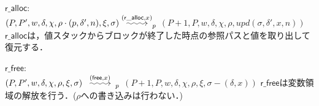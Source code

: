 \documentclass[submit,PRO]{ipsj}
\makeatletter
\newcommand{\longsquiggly}{\xymatrix{{}\ar@{~>}[r]&{}}}
\newcommand{\bcode}[1]{$\mathsf{#1}$}
\newcommand{\brightarrow}[1]{\stackrel{#1}{\longsquiggly}}
\makeatother
\begin{document}
\begin{list}
\item \bcode{r\_alloc}:\\\relax
$(P,P',w,\delta,\chi,\rho\cdot(p,\delta',n),\xi,\sigma)\brightarrow{(\mathsf{r\_alloc},x)}_p$\newline
\qquad $(P+1,P,w,\delta,\chi,\rho,upd(\sigma,\delta',x,n))$\newline
\bcode{r\_alloc}は，値スタックからブロックが終了した時点の参照パスと値を取り出して復元する．
\item \bcode{r\_free}:\\
$(P,P',w,\delta,\chi,\rho,\xi,\sigma)\brightarrow{(\mathsf{free},x)}_p$\newline
\qquad $(P+1,P,w,\delta,\chi,\rho,\xi,\sigma-(\delta,x))$\newline
\bcode{r\_free}は変数領域の解放を行う．($\rho$への書き込みは行わない．)

\end{list}
\end{document}
